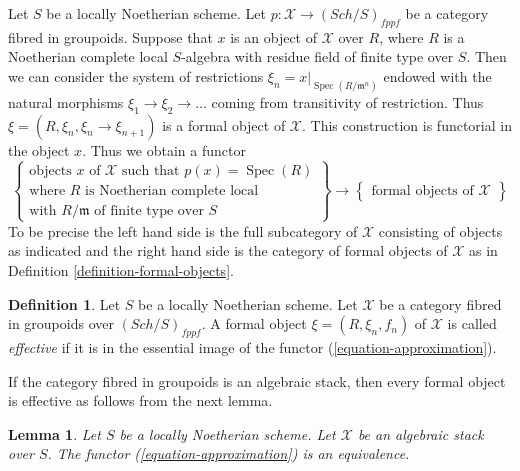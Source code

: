 \documentclass{stacks-project}
\theoremstyle{plain}
\newtheorem{lemma}[subsection]{Lemma}
\theoremstyle{definition}
\newtheorem{definition}[subsection]{Definition}
\theoremstyle{remark}
\numberwithin{equation}{subsection}
\def\Spec{\mathop{\mathrm{Spec}}}
\def\Sch{\mathit{Sch}}
\begin{document}
\noindent
Let $S$ be a locally Noetherian scheme. Let
$p : \mathcal{X} \to (\Sch/S)_{fppf}$ be a category fibred in groupoids.
Suppose that $x$ is an object of $\mathcal{X}$ over $R$, where $R$ is a
Noetherian complete local $S$-algebra with residue field of finite type
over $S$. Then we can consider the system of restrictions
$\xi_n = x|_{\Spec(R/\mathfrak m^n)}$ endowed with the natural morphisms
$\xi_1 \to \xi_2 \to \ldots$ coming from transitivity of restriction.
Thus $\xi = (R, \xi_n, \xi_n \to \xi_{n + 1})$ is a formal object of
$\mathcal{X}$. This construction is functorial in the object $x$.
Thus we obtain a functor
\begin{equation}
\label{equation-approximation}
\left\{
\begin{matrix}
\text{objects }x\text{ of }\mathcal{X} \text{ such that }p(x) = \Spec(R) \\
\text{where }R\text{ is Noetherian complete local}\\
\text{with }R/\mathfrak m\text{ of finite type over }S
\end{matrix}
\right\}
\longrightarrow
\left\{
\begin{matrix}
\text{formal objects of }\mathcal{X}
\end{matrix}
\right\}
\end{equation}
To be precise the left hand side is the full subcategory of $\mathcal{X}$
consisting of objects as indicated and the right hand side is the category
of formal objects of $\mathcal{X}$ as in
Definition \ref{definition-formal-objects}.

\begin{definition}
\label{definition-effective}
Let $S$ be a locally Noetherian scheme. Let $\mathcal{X}$ be a category
fibred in groupoids over $(\Sch/S)_{fppf}$. A formal object
$\xi = (R, \xi_n, f_n)$ of $\mathcal{X}$ is called {\it effective}
if it is in the essential image of the functor
(\ref{equation-approximation}).
\end{definition}

\noindent
If the category fibred in groupoids is an algebraic stack, then every
formal object is effective as follows from the next lemma.

\begin{lemma}
\label{lemma-effective}
Let $S$ be a locally Noetherian scheme. Let $\mathcal{X}$ be an algebraic
stack over $S$. The functor (\ref{equation-approximation}) is an equivalence.
\end{lemma}
\end{document}

